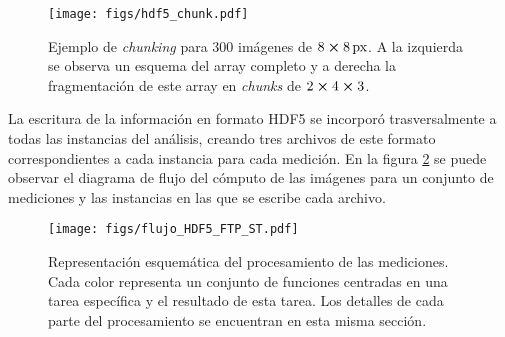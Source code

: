 \documentclass[../main.tex]{subfiles}
\begin{document}
\begin{figure}[H]
    \centering
    \texttt{[image: figs/hdf5\_chunk.pdf]}
    \caption{Ejemplo de \textit{chunking} para $300$ imágenes de $8\cross 8\,\si{px}$. A la izquierda se observa un esquema del array completo y a derecha la fragmentación de este array en \textit{chunks} de $2\cross4\cross3$.}
    \label{fig:hdf5_chunk}
\end{figure}

La escritura de la información en formato HDF5 se incorporó trasversalmente a todas las instancias del análisis, creando tres archivos de este formato correspondientes a cada instancia para cada medición. En la figura \ref{fig:flujo_hdf5_ftp_st} se puede observar el diagrama de flujo del cómputo de las imágenes para un conjunto de mediciones y las instancias en las que se escribe cada archivo.



\begin{figure}[H]
    \centering
    \texttt{[image: figs/flujo\_HDF5\_FTP\_ST.pdf]}
    \caption{Representación esquemática del procesamiento de las mediciones. Cada color representa un conjunto de funciones centradas en una tarea específica y el resultado de esta tarea. Los detalles de cada parte del procesamiento se encuentran en esta misma sección.}
    \label{fig:flujo_hdf5_ftp_st}
\end{figure}
\end{document}
